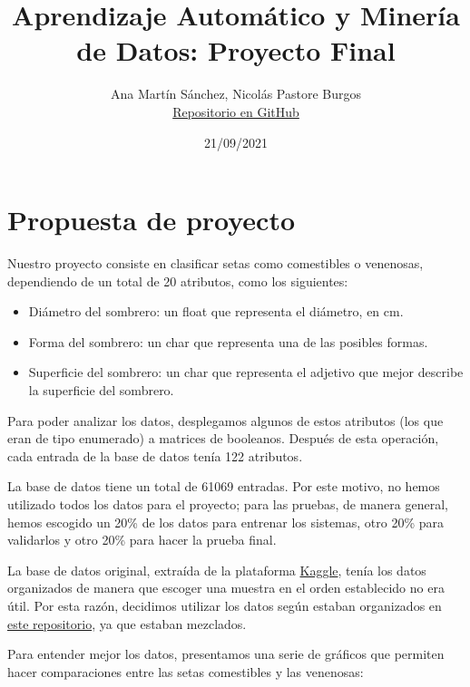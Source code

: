 \documentclass[11pt]{article}
\title{Aprendizaje Automático y Minería de Datos: Proyecto Final}
\author{Ana Martín Sánchez, Nicolás Pastore Burgos\\ \href{https://github.com/NicoPast/AA}{Repositorio en GitHub}}
\date{21/09/2021}
\begin{document}
\maketitle

\section{Propuesta de proyecto}

	Nuestro proyecto consiste en clasificar setas como comestibles o venenosas, dependiendo de un total de 20 atributos, como los siguientes:
\begin{itemize}
\item  Diámetro del sombrero: un float que representa el diámetro, en cm.
\item  Forma del sombrero: un char que representa una de las posibles formas.
\item  Superficie del sombrero: un char que representa el adjetivo que mejor describe la superficie del sombrero.
\end{itemize}
	
    Para poder analizar los datos, desplegamos algunos de estos atributos (los que eran de tipo enumerado) a matrices de booleanos. Después de esta operación, cada entrada de la base de datos tenía 122 atributos.

	La base de datos tiene un total de 61069 entradas. Por este motivo, no hemos utilizado todos los datos para el proyecto; para las pruebas, de manera general, hemos escogido un 20\% de los datos para entrenar los sistemas, otro 20\% para validarlos y otro 20\% para hacer la prueba final.
    
    La base de datos original, extraída de la plataforma \href{https://www.kaggle.com/dhinaharp/mushroom-dataset }{Kaggle}, tenía los datos organizados de manera que escoger una muestra en el orden establecido no era útil. Por esta razón, decidimos utilizar los datos según estaban organizados en \href{https://mushroom.mathematik.uni-marburg.de/files/}{este repositorio}, ya que estaban mezclados. 
    
    Para entender mejor los datos, presentamos una serie de gráficos que permiten hacer comparaciones entre las setas comestibles y las venenosas:
   
\end{document}
